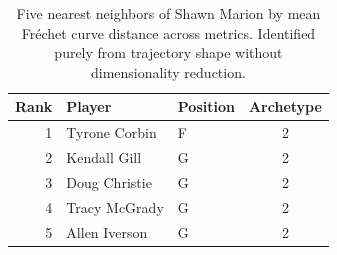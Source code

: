 \begin{table}[htbp]
  \centering\small
  \begin{tabular}{rllc}
    \toprule
    Rank & Player & Position & Archetype \\
    \midrule
    1 & Tyrone Corbin & F & 2 \\
    2 & Kendall Gill & G & 2 \\
    3 & Doug Christie & G & 2 \\
    4 & Tracy McGrady & G & 2 \\
    5 & Allen Iverson & G & 2 \\
    \bottomrule
  \end{tabular}
  \caption{Five nearest neighbors of Shawn Marion by mean Fr\'{e}chet curve distance across metrics. Identified purely from trajectory shape without dimensionality reduction.}
  \label{tab:Shawn_Marion_frechet_curve_neighbors}
\end{table}

